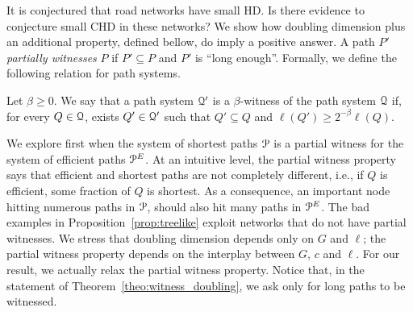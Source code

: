 It is conjectured that road networks have small HD.
Is there evidence to conjecture small CHD in these networks?
We show how doubling dimension plus an additional property, defined bellow, do imply a positive answer.
A path $P'$ \emph{partially witnesses} $P$ if $P'\subseteq P$ and $P'$ is ``long enough''.
Formally, we define the following relation for path systems.

\begin{definition}
Let $\beta\geq 0$.
We say that a path system $\mathcal{Q}'$ is a $\beta$-witness of the path system $\mathcal{Q}$ if, for every $Q\in\mathcal{Q}$, exists $Q'\in\mathcal{Q}'$ such that $Q'\subseteq Q$ and $\ell(Q')\geq 2^{-\beta}\ell(Q)$.
\end{definition}

We explore first when the system of shortest paths $\mathcal{P}$ is a partial witness for the system of efficient paths $\mathcal{P}^E$.
At an intuitive level, the partial witness property says that efficient and shortest paths are not completely different, i.e., if $Q$ is efficient, some fraction of $Q$ is shortest.
As a consequence, an important node hitting numerous paths in $\mathcal{P}$, should also hit many paths in $\mathcal{P}^E$.
The bad examples in Proposition~\ref{prop:treelike} exploit networks that do not have partial witnesses.
We stress that doubling dimension depends only on $G$ and $\ell$; the partial witness property depends on the interplay between $G$, $c$ and $\ell$.
For our result, we actually relax the partial witness property.
Notice that, in the statement of Theorem~\ref{theo:witness_doubling}, we ask only for long paths to be witnessed.

